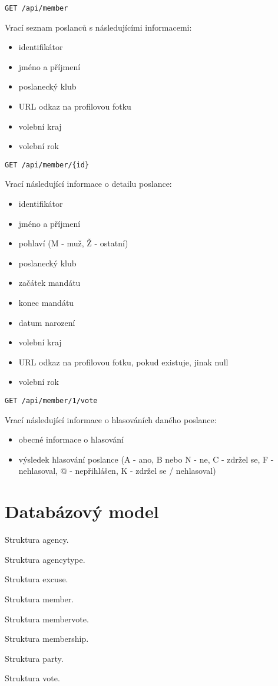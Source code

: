 \vspace{10px}

\begin{lstlisting}
GET /api/member
\end{lstlisting}

\noindent Vrací seznam poslanců s následujícími informacemi:

\begin{itemize}
	\item identifikátor
	\item jméno a příjmení
	\item poslanecký klub
	\item URL odkaz na profilovou fotku
	\item volební kraj
	\item volební rok
\end{itemize}

\vspace{10px}

\begin{lstlisting}
GET /api/member/{id}
\end{lstlisting}

\noindent Vrací následující informace o detailu poslance:

\begin{itemize}
	\item identifikátor
	\item jméno a příjmení
	\item pohlaví (M - muž, Ž - ostatní)
	\item poslanecký klub
	\item začátek mandátu
	\item konec mandátu
	\item datum narození
	\item volební kraj
	\item URL odkaz na profilovou fotku, pokud existuje, jinak null
	\item volební rok
\end{itemize}

\vspace{10px}

\begin{lstlisting}
GET /api/member/1/vote
\end{lstlisting}

\noindent Vrací následující informace o hlasováních daného poslance:

\begin{itemize}
\item obecné informace o hlasování
\item výsledek hlasování poslance (A - ano, B nebo N - ne, C - zdržel se, F - nehlasoval, @ - nepřihlášen, K - zdržel se / nehlasoval)
\end{itemize}

\section{Databázový model}
\label{sec:database_model}

Struktura agency.

Struktura agency\textunderscore type.

Struktura excuse.

Struktura member.

Struktura member\textunderscore vote.

Struktura membership.

Struktura party.

Struktura vote.